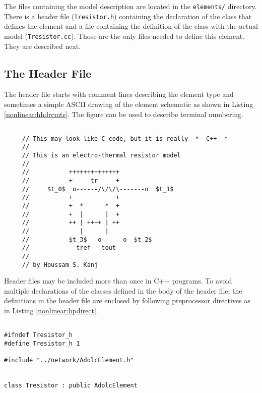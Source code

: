 The files containing the model description are located in the
\texttt{elements/} directory. There is a header file
(\texttt{Tresistor.h}) containing the declaration of the class that
defines the element and a file containing the definition of the class
with the actual model (\texttt{Tresistor.cc}). Those are the only files
needed to define this element. They are described next.

\newpage
\subsection{The Header File}

The header file starts with comment lines describing the element
type and sometimes a simple ASCII drawing of the element schematic
as shown in Listing \ref{nonlinear:hhdrcmts}. The figure can be used to
describe terminal numbering.

\begin{lstlisting}[firstnumber=1, label={nonlinear:hhdrcmts},
    caption={Header Comments of Tresistor.h}]

     // This may look like C code, but it is really -*- C++ -*-
     //
     // This is an electro-thermal resistor model
     //
     //           ++++++++++++++
     //           +     tr     +
     //     $t_0$  o------/\/\/\-------o  $t_1$
     //           +            +
     //           +  *      *  +
     //           +  |      |  +
     //           ++ | ++++ | ++
     //              |      |
     //           $t_3$   o      o  $t_2$
     //             tref   tout
     //
     // by Houssam S. Kanj
\end{lstlisting}

Header files may be included more than once in C++ programs. To
avoid multiple declarations of the classes defined in the body of
the header file, the definitions in the header file are enclosed
by following preprocessor directives as in Listing
\ref{nonlinear:hpdirect}.

\begin{lstlisting}[firstnumber=last, label={nonlinear:hpdirect},
    caption={Preprocessor Directives of Tresistor.h}]

#ifndef Tresistor_h
#define Tresistor_h 1

#include "../network/AdolcElement.h"


class Tresistor : public AdolcElement

\end{lstlisting}

